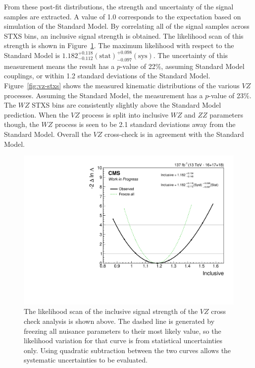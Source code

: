 From these post-fit distributions, the strength and uncertainty of the signal samples are extracted.
A value of 1.0 corresponds to the expectation based on simulation of the Standard Model.
By correlating all of the signal samples across STXS bins,
an inclusive signal strength is obtained.
The likelihood scan of this strength is shown in Figure~\ref{fig:vz-inclusive}.
The maximum likelihood with respect to the Standard Model is
$1.182^{+0.118}_{-0.112} \mathrm{(stat)}^{+0.098}_{-0.097} \mathrm{(sys)}$.
The uncertainty of this measurement means the result has a $p$-value of 22\%, assuming Standard Model couplings,
or within 1.2 standard deviations of the Standard Model.
Figure~\ref{fig:vz-stxs} shows the measured kinematic distributions of the various $V\!Z$ processes.
Assuming the Standard Model, the measurement has a $p$-value of 23\%.
The $W\!Z$ STXS bins are consistently slightly above the Standard Model prediction.
When the $V\!Z$ process is split into inclusive $W\!Z$ and $Z\!Z$ parameters though,
the $W\!Z$ process is seen to be 2.1 standard deviations away from the Standard Model.
Overall the $V\!Z$ cross-check is in agreement with the Standard Model.

\begin{figure}
  \centering
  \includegraphics[width=0.7\linewidth]{figures/210309_inclVZ_unblinded_XbbVZ_e4179c95_a866aef8/scan_nominal_r.pdf}
  \caption[Inclusive likelihood scan of $V\!Z$]{
    The likelihood scan of the inclusive signal strength of the
    $V\!Z$ cross check analysis is shown above.
    The dashed line is generated by freezing all nuisance parameters to their most likely value,
    so the likelihood variation for that curve is from statistical uncertainties only.
    Using quadratic subtraction between the two curves allows the
    systematic uncertainties to be evaluated.
  }
  \label{fig:vz-inclusive}
\end{figure}

